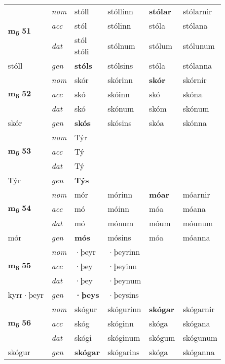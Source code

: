 \begin{longtable}[l]{X>{\footnotesize\itshape}XXXXX}
\multirow{3}{*}{{{\textbf{m{\textsubscript{6}}} \Large{\textbf{51}}}}} & nom & stóll & stóllinn & \textbf{stólar} & stólarnir \\*
 & acc & stól & stólinn & stóla & stólana \\*
 & dat & \specialcell{stól\\ stóli} & stólnum & stólum & stólunum \\*
 {\footnotesize{stóll}} & gen & \textbf{stóls} & stólsins & stóla & stólanna \\
\cmidrule{1-6}

\multirow{3}{*}{{{\textbf{m{\textsubscript{6}}} \Large{\textbf{52}}}}} & nom & skór & skórinn & \textbf{skór} & skórnir \\*
 & acc & skó & skóinn & skó & skóna \\*
 & dat & skó & skónum & skóm & skónum \\*
 {\footnotesize{skór}} & gen & \textbf{skós} & skósins & skóa & skónna \\
\cmidrule{1-6}

\multirow{3}{*}{{{\textbf{m{\textsubscript{6}}} \Large{\textbf{53}}}}} & nom & Týr &  & \textbf{} &  \\*
 & acc & Tý &  &  &  \\*
 & dat & Tý &  &  &  \\*
 {\footnotesize{Týr}} & gen & \textbf{Týs} &  &  &  \\
\cmidrule{1-6}

\multirow{3}{*}{{{\textbf{m{\textsubscript{6}}} \Large{\textbf{54}}}}} & nom & mór & mórinn & \textbf{móar} & móarnir \\*
 & acc & mó & móinn & móa & móana \\*
 & dat & mó & mónum & móum & móunum \\*
 {\footnotesize{mór}} & gen & \textbf{mós} & mósins & móa & móanna \\
\cmidrule{1-6}

\multirow{3}{*}{{{\textbf{m{\textsubscript{6}}} \Large{\textbf{55}}}}} & nom & ·þeyr & ·þeyrinn & \textbf{} &  \\*
 & acc & ·þey & ·þeyinn &  &  \\*
 & dat & ·þey & ·þeynum &  &  \\*
 {\footnotesize{kyrr\allowbreak ·þeyr}} & gen & \textbf{·þeys} & ·þeysins &  &  \\
\cmidrule{1-6}

\multirow{3}{*}{{{\textbf{m{\textsubscript{6}}} \Large{\textbf{56}}}}} & nom & skógur & skógurinn & \textbf{skógar} & skógarnir \\*
 & acc & skóg & skóginn & skóga & skógana \\*
 & dat & skógi & skóginum & skógum & skógunum \\*
 {\footnotesize{skógur}} & gen & \textbf{skógar} & skógarins & skóga & skóganna \\
\cmidrule{1-6}


\end{longtable}
